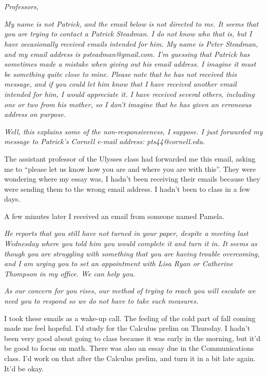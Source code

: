 \section{}

\textit{Professors,}

\textit{My name is not Patrick, and the email below is not directed to me.  It seems
that you are trying to contact a Patrick Steadman.  I do not know who that is,
but I have occasionally received emails intended for him.  My name is Peter
Steadman, and my email address is psteadman@gmail.com.  I'm guessing that
Patrick has sometimes made a mistake when giving out his email address.  I
imagine it must be something quite close to mine.  Please note that he has not
received this message, and if you could let him know that I have received
another email intended for him, I would appreciate it.  I have received
several others, including one or two from his mother, so I don't imagine that
he has given an erroneous address on purpose.
}

\textit{Well, this explains some of the non-responsiveness, I suppose.  I just
forwarded my message to Patrick's Cornell e-mail address:  pts44@cornell.edu.}


The assistant professor of the Ulysses class had forwarded me this email, asking
me to ``please let us know how you are and where you are with this''.  They were
wondering where my essay was, I hadn't been receiving their emails because they
were sending them to the wrong email address.  I hadn't been to class in a few
days.

A few minutes later I received an email from someone named Pamela.

\textit{
He reports that you still have not turned in your paper, despite a meeting last
Wednesday where you told him you would complete it and turn it in.  It seems as
though you are struggling with something that you are having trouble
overcoming, and I am urging you to set an appointment with Lisa Ryan or
Catherine Thompson in my office.  We can help you. }

\textit{
As our concern for you rises, our method of trying to reach you will escalate 
we need you to respond so we do not have to take such measures.}



I took these emails as a wake-up call.  The feeling of the cold part of fall
coming made me feel hopeful.  I'd study for the Calculus prelim on Thursday.  I
hadn't been very good about going to class because it was early in the morning,
but it'd be good to focus on math.  There was also an essay due in the
Communications class.  I'd work on that after the Calculus prelim, and turn it
in a bit late again.  It'd be okay.


